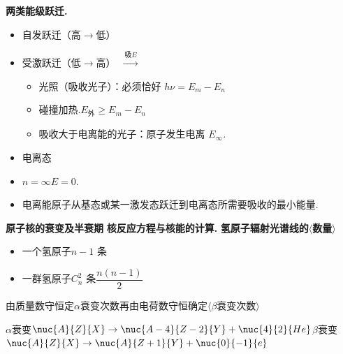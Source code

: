 \textbf{两类能级跃迁.} %
\begin{itemize}
\item 自发跃迁（高$\to$低）
\item 受激跃迁（低$\to$高）\ $\xrightarrow{\ \text{吸}E\ }$
  \begin{itemize}
  \item 光照（吸收光子）：必须恰好 $h\nu=E_m-E_n$
  \item 碰撞加热.\quad $E_{\text{外}}\ge E_m-E_n$
  \item 吸收大于电离能的光子：原子发生电离 $E_\infty$.
  \end{itemize}
\end{itemize}

\begin{itemize}
\item 电离态
\item $n=\infty$\quad $E=0$. %
\item 电离能\quad 原子从基态或某一激发态跃迁到电离态所需要吸收的最小能量.
\end{itemize}
\textbf{原子核的衰变及半衰期}
\textbf{核反应方程与核能的计算.}
\textbf{氢原子辐射光谱线的$\langle$数量$\rangle$} %
\begin{itemize}
\item[] 一个氢原子\quad $n-1$ 条
\item[] 一群氢原子\quad $C_n^2$ 条\quad $\dfrac{n(n-1)}{2}$
\end{itemize}
由质量数守恒定$\alpha$衰变次数\quad 再由电荷数守恒确定$\langle$$\beta$衰变次数$\rangle$ %

\noindent $\alpha$衰变\quad $\nuc{A}{Z}{X}\to\nuc{A-4}{Z-2}{Y}+\nuc{4}{2}{He}$\qquad $\beta$衰变\quad $\nuc{A}{Z}{X}\to\nuc{A}{Z+1}{Y}+\nuc{0}{-1}{e}$

